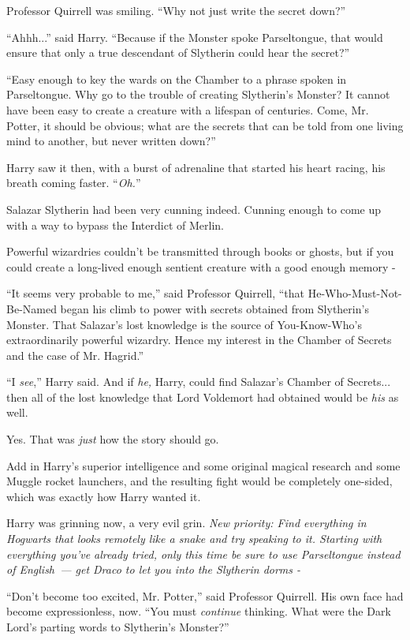 Professor Quirrell was smiling. ``Why not just write the secret down?''

``Ahhh...'' said Harry. ``Because if the Monster spoke Parseltongue, that would ensure that only a true descendant of Slytherin could hear the secret?''

``Easy enough to key the wards on the Chamber to a phrase spoken in Parseltongue. Why go to the trouble of creating Slytherin's Monster? It cannot have been easy to create a creature with a lifespan of centuries. Come, Mr. Potter, it should be obvious; what are the secrets that can be told from one living mind to another, but never written down?''

Harry saw it then, with a burst of adrenaline that started his heart racing, his breath coming faster. ``\emph{Oh.}''

Salazar Slytherin had been very cunning indeed. Cunning enough to come up with a way to bypass the Interdict of Merlin.

Powerful wizardries couldn't be transmitted through books or ghosts, but if you could create a long-lived enough sentient creature with a good enough memory -

``It seems very probable to me,'' said Professor Quirrell, ``that He-Who-Must-Not-Be-Named began his climb to power with secrets obtained from Slytherin's Monster. That Salazar's lost knowledge is the source of You-Know-Who's extraordinarily powerful wizardry. Hence my interest in the Chamber of Secrets and the case of Mr. Hagrid.''

``I \emph{see},'' Harry said. And if \emph{he,} Harry, could find Salazar's Chamber of Secrets... then all of the lost knowledge that Lord Voldemort had obtained would be \emph{his} as well.

Yes. That was \emph{just} how the story should go.

Add in Harry's superior intelligence and some original magical research and some Muggle rocket launchers, and the resulting fight would be completely one-sided, which was exactly how Harry wanted it.

Harry was grinning now, a very evil grin. \emph{New priority: Find everything in Hogwarts that looks remotely like a snake and try speaking to it. Starting with everything you've already tried, only this time be sure to use Parseltongue instead of English~--- get Draco to let you into the Slytherin dorms -}

``Don't become too excited, Mr. Potter,'' said Professor Quirrell. His own face had become expressionless, now. ``You must \emph{continue} thinking. What were the Dark Lord's parting words to Slytherin's Monster?''

